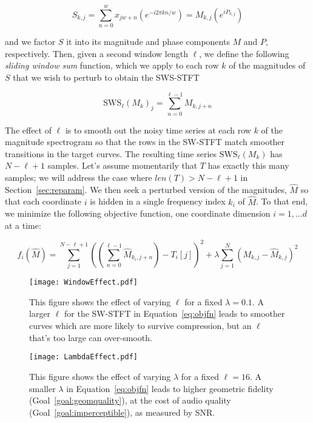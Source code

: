 \documentclass[runningheads]{llncs}
\begin{document}
\begin{equation}
  S_{k, j} = \sum_{n = 0}^w x_{jw + n} \left(e^{-i 2 \pi k n / w} \right) = M_{k, j} \left( e^{i P_{k, j}} \right)
\end{equation}

and we factor $S$ it into its magnitude and phase components $M$ and $P$, respectively.  Then, given a second window length $\ell$, we define the following {\em sliding window sum} function, which we apply to each row $k$ of the magnitudes of $S$ that we wish to perturb to obtain the SWS-STFT

\begin{equation}
  \text{SWS}_{\ell}\left({M_k}\right)_j = \sum_{n = 0}^{\ell-1} M_{k, j+n}
\end{equation}

The effect of $\ell$ is to smooth out the noisy time series at each row $k$ of the magnitude spectrogram so that the rows in the SW-STFT match smoother transitions in the target curves.  The resulting time series $\text{SWS}_{\ell}\left({M_k}\right)$ has $N-\ell+1$ samples.  Let's assume momentarily that $T$ has exactly this many samples; we will address the case where $len(T) > N-\ell+1$ in Section~\ref{sec:reparam}.  We then seek a perturbed version of the magnitudes, $\hat{M}$ so that each coordinate $i$ is hidden in a single frequency index $k_i$ of $\hat{M}$.  To that end, we minimize the following objective function, one coordinate dimension $i = 1, ... d$ at a time:

\begin{equation}
  \label{eq:objfn}
  f_i(\hat{M}) = \sum_{j=1}^{N-\ell+1} \left( \left( \sum_{n = 0}^{\ell-1} \hat{M}_{k_i, j+n} \right) - T_i[j] \right)^2 + \lambda \sum_{j=1}^N \left( M_{k, j} - \hat{M}_{k, j} \right)^2
\end{equation}



\begin{figure}
  \centering
  \texttt{[image: WindowEffect.pdf]}
  \caption{This figure shows the effect of varying $\ell$ for a fixed $\lambda=0.1$.  A larger $\ell$ for the SW-STFT in Equation~\ref{eq:objfn} leads to smoother curves which are more likely to survive compression, but an $\ell$ that's too large can over-smooth.}
  \label{fig:WindowEffect}
\end{figure}

\begin{figure}
  \centering
  \texttt{[image: LambdaEffect.pdf]}
  \caption{This figure shows the effect of varying $\lambda$ for a fixed $\ell=16$.  A smaller $\lambda$ in Equation~\ref{eq:objfn} leads to higher geometric fidelity (Goal~\ref{goal:geomquality}), at the cost of audio quality (Goal~\ref{goal:imperceptible}), as measured by SNR.}
  \label{fig:LambdaEffect}
\end{figure}
\end{document}
